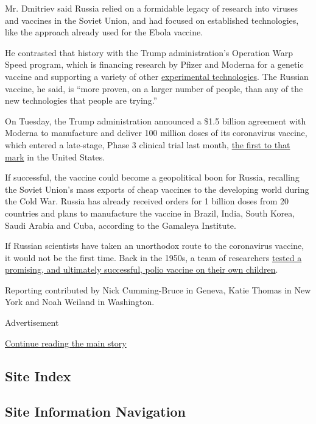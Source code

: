 Mr. Dmitriev said Russia relied on a formidable legacy of research into
viruses and vaccines in the Soviet Union, and had focused on established
technologies, like the approach already used for the Ebola vaccine.

He contrasted that history with the Trump administration's Operation
Warp Speed program, which is financing research by Pfizer and Moderna
for a genetic vaccine and supporting a variety of other
\href{https://www.nytimes3xbfgragh.onion/2020/08/09/business/coronavirus-vaccine-inovio.html?action=click\&module=News\&pgtype=Homepage}{experimental
technologies}. The Russian vaccine, he said, is ``more proven, on a
larger number of people, than any of the new technologies that people
are trying.''

On Tuesday, the Trump administration announced a \$1.5 billion agreement
with Moderna to manufacture and deliver 100 million doses of its
coronavirus vaccine, which entered a late-stage, Phase 3 clinical trial
last month,
\href{https://www.nytimes3xbfgragh.onion/2020/07/27/health/moderna-vaccine-covid.html}{the
first to that mark} in the United States.

If successful, the vaccine could become a geopolitical boon for Russia,
recalling the Soviet Union's mass exports of cheap vaccines to the
developing world during the Cold War. Russia has already received orders
for 1 billion doses from 20 countries and plans to manufacture the
vaccine in Brazil, India, South Korea, Saudi Arabia and Cuba, according
to the Gamaleya Institute.

If Russian scientists have taken an unorthodox route to the coronavirus
vaccine, it would not be the first time. Back in the 1950s, a team of
researchers
\href{https://www.nytimes3xbfgragh.onion/2020/06/24/world/europe/vaccine-repurposing-polio-coronavirus.html}{tested
a promising, and ultimately successful, polio vaccine on their own
children}.

Reporting contributed by Nick Cumming-Bruce in Geneva, Katie Thomas in
New York and Noah Weiland in Washington.

Advertisement

\protect\hyperlink{after-bottom}{Continue reading the main story}

\hypertarget{site-index}{%
\subsection{Site Index}\label{site-index}}

\hypertarget{site-information-navigation}{%
\subsection{Site Information
Navigation}\label{site-information-navigation}}

